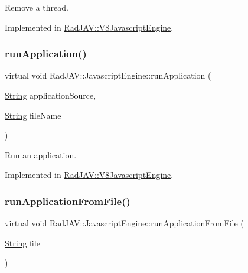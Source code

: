 Remove a thread. 



Implemented in \mbox{\hyperlink{class_rad_j_a_v_1_1_v8_javascript_engine_a90a52c8c7d655d2e8e5e682d7618c2ab}{Rad\+J\+A\+V\+::\+V8\+Javascript\+Engine}}.

\mbox{\label{class_rad_j_a_v_1_1_javascript_engine_a11cc903f042db2b770183667ee36c6bf}} 
\subsubsection{\texorpdfstring{run\+Application()}{runApplication()}}
{\footnotesize\ttfamily virtual void Rad\+J\+A\+V\+::\+Javascript\+Engine\+::run\+Application (\begin{DoxyParamCaption}\item[{\mbox{\hyperlink{class_rad_j_a_v_1_1_string}{String}}}]{application\+Source,  }\item[{\mbox{\hyperlink{class_rad_j_a_v_1_1_string}{String}}}]{file\+Name }\end{DoxyParamCaption})\hspace{0.3cm}{\ttfamily [pure virtual]}}



Run an application. 



Implemented in \mbox{\hyperlink{class_rad_j_a_v_1_1_v8_javascript_engine_af792154ac1ceaa6c65faf2409cea5014}{Rad\+J\+A\+V\+::\+V8\+Javascript\+Engine}}.

\mbox{\label{class_rad_j_a_v_1_1_javascript_engine_a0a435f458e118a813c95ccb359d546e9}} 
\subsubsection{\texorpdfstring{run\+Application\+From\+File()}{runApplicationFromFile()}}
{\footnotesize\ttfamily virtual void Rad\+J\+A\+V\+::\+Javascript\+Engine\+::run\+Application\+From\+File (\begin{DoxyParamCaption}\item[{\mbox{\hyperlink{class_rad_j_a_v_1_1_string}{String}}}]{file }\end{DoxyParamCaption})\hspace{0.3cm}{\ttfamily [pure virtual]}}



